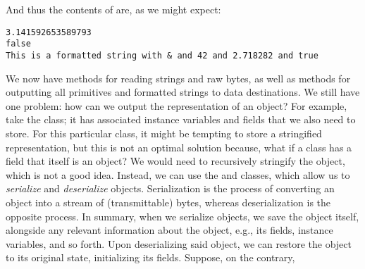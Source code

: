 And thus the contents of  are, as we might expect:

\begin{verbatim}
3.141592653589793
false
This is a formatted string with & and 42 and 2.718282 and true
\end{verbatim}

We now have methods for reading strings and raw bytes, as well as methods for outputting all primitives and formatted strings to data destinations. We still have one problem: how can we output the representation of an object? For example, take the  class; it has associated instance variables and fields that we also need to store. For this particular class, it might be tempting to store a stringified representation, but this is not an optimal solution because, what if a class has a field that itself is an object? We would need to recursively stringify the object, which is not a good idea. Instead, we can use the  and  classes, which allow us to \textit{serialize} and \textit{deserialize} objects. Serialization is the process of converting an object into a stream of (transmittable) bytes, whereas deserialization is the opposite process. In summary, when we serialize objects, we save the object itself, alongside any relevant information about the object, e.g., its fields, instance variables, and so forth. Upon deserializing said object, we can restore the object to its original state, initializing its fields. Suppose, on the contrary,


